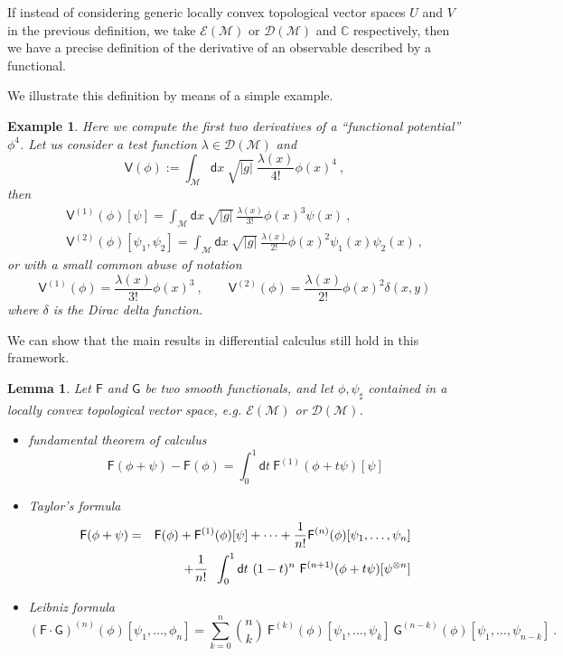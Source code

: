 \documentclass[11pt]{book}
\newcommand{\bigint}{\displaystyle\int}
\newcommand{\abs}[1]{\left|#1\right|}
\newcommand{\Dcal}{\mathcal{D}}
\newcommand{\Ecal}{\mathcal{E}}
\newcommand{\Mcal}{\mathcal{M}}
\newcommand{\Cbb}{\mathbb{C}}
\newcommand{\Fsf}{\mathsf{F}}
\newcommand{\Gsf}{\mathsf{G}}
\newcommand{\Vsf}{\mathsf{V}}
\newcommand{\dsf}{\mathsf{d}}
\theoremstyle{break}
\newtheorem{lemma}{Lemma}[chapter]
\newtheorem{example}{Example}[chapter]
\begin{document}
If instead of considering generic locally convex topological vector spaces $U$ and $V$ in the previous definition, we take $\Ecal(\Mcal)$ or $\Dcal(\Mcal)$ and $\Cbb$ respectively, then we have a precise definition of the derivative of an observable described by a functional.

\bigskip

We illustrate this definition by means of a simple example. 


\begin{example}
Here we compute the first two derivatives of a ``functional potential'' $\phi^4$. Let us consider a test function $\lambda \in \Dcal(\Mcal)$ and 
%
\begin{equation*}
\Vsf(\phi) := \int_\Mcal \dsf x \ \sqrt{\abs{g}} \ \frac{\lambda(x)}{4!} \phi(x)^4 \ ,
\end{equation*}
%
then
%
\begin{eqnarray*}
&& \Vsf^{(1)}(\phi)[\psi] = \int_\Mcal \dsf x \ \sqrt{\abs{g}} \ \frac{\lambda(x)}{3!} \phi(x)^3  \psi(x)\ , \\
%
&& \Vsf^{(2)}(\phi)[\psi_1,\psi_2] = \int_\Mcal \dsf x  \ \sqrt{\abs{g}} \ \frac{\lambda(x)}{2!} \phi(x)^2 \psi_1(x)\psi_2(x) \ ,
\end{eqnarray*}
%
or with a small common abuse of notation
%
\begin{equation*}
\Vsf^{(1)}(\phi) = \frac{\lambda(x)}{3!} \phi(x)^3 \ , \qquad
%
\Vsf^{(2)}(\phi) = \frac{\lambda(x)}{2!} \phi(x)^2 \delta(x,y)  
\end{equation*}
%
where $\delta$ is the Dirac delta function. 
\end{example}


We can show that the main results in differential calculus still hold in this framework.


\begin{lemma}
%
Let $\Fsf$ and $\Gsf$ be two smooth functionals, and let $\phi , \psi_{\sharp}$ contained in a locally convex topological vector space, e.g. $\Ecal(\Mcal)$ or $\Dcal(\Mcal)$. 
%
\begin{itemize}
%
\item fundamental theorem of calculus
%
\begin{equation*}
\Fsf(\phi + \psi) - \Fsf(\phi) = \int_0^1 \dsf t \ \Fsf^{(1)}(\phi+t\psi)[\psi] 
\end{equation*}
%
\item Taylor's formula
\begin{eqnarray*}
\Fsf(\phi + \psi) &=& \Fsf(\phi) + \Fsf^{(1)}(\phi)[\psi] + \dots + \frac{1}{n!} \Fsf^{(n)}(\phi)[\psi_1,\dots,\psi_n] \\
&& + \cfrac{1}{n!} \ \ \bigint_0^1 \dsf t \ (1-t)^n \ \Fsf^{(n+1)}(\phi+t\psi)[\psi^{\otimes n}]
\end{eqnarray*}
%
\item Leibniz formula
\begin{equation*}
\left(\Fsf \cdot \Gsf\right)^{(n)}(\phi)[\psi_1, \dots ,\phi_n] = \sum_{k=0}^{n} \binom{n}{k} \ \Fsf^{(k)}(\phi)[\psi_1, \dots , \psi_k] \ \Gsf^{(n-k)}(\phi)[\psi_1, \dots , \psi_{n-k}] \ .
\end{equation*}
%
\end{itemize}
%
\end{lemma}
\end{document}
